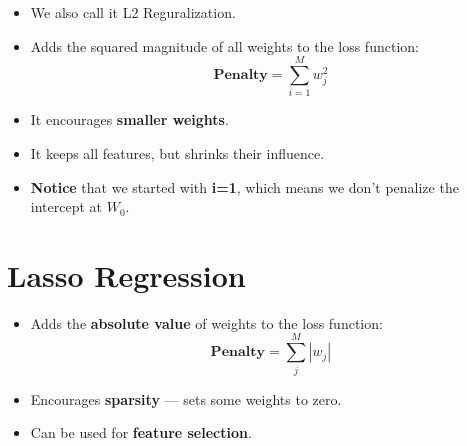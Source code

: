 \documentclass[20pt]{article}
\begin{document}
\begin{itemize}
    \item We also call it L2 Reguralization.

    \item Adds the squared magnitude of all weights to the loss function:
    \begin{equation}
        \mathbf{Penalty} = \sum_{i=1}^{M} w_j^2
    \end{equation}

    \item It encourages \textbf{smaller weights}.

    \item It keeps all features, but shrinks their influence.
    \item \textbf{Notice} that we started with \textbf{i=1}, which means we don't penalize the intercept at $W_0$.
\end{itemize}

\section{Lasso Regression}

\begin{itemize}
    \item Adds the \textbf{absolute value} of weights to the loss function:
    \begin{equation}
        \mathbf{Penalty} = \sum_{j}^{M} \left| w_j \right|
    \end{equation}

    \item Encourages \textbf{sparsity} — sets some weights to zero.

    \item Can be used for \textbf{feature selection}.

\end{itemize}
\end{document}
